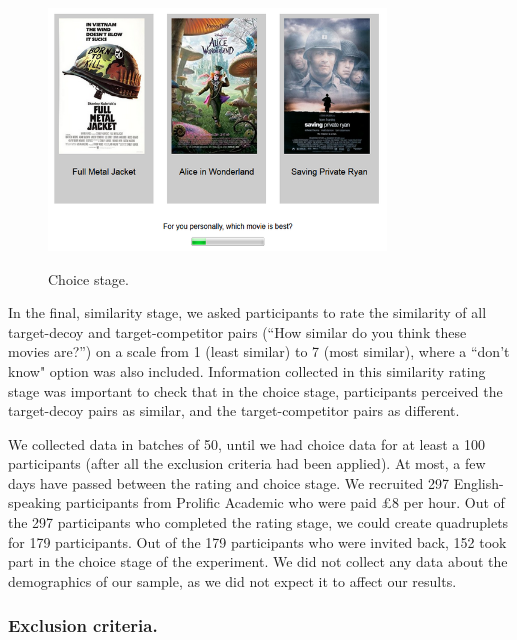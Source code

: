 \documentclass[12pt, a4paper]{article}
\begin{document}
\begin{figure}[htb!]
\centering
\caption{Choice stage.}
\includegraphics[width=0.8\textwidth]{rsz_exp1_choicestage.png}
\label{fig:exp1_screenshot}
\end{figure}

In the final, similarity stage, we asked participants to rate the similarity of all target-decoy and target-competitor pairs (``How similar do you think these movies are?'') on a scale from 1 (least similar) to 7 (most similar), where a ``don't know" option was also included. Information collected in this similarity rating stage was important to check that in the choice stage, participants perceived the target-decoy pairs as similar, and the target-competitor pairs as different.

We collected data in batches of 50, until we had choice data for at least a 100 participants (after all the exclusion criteria had been applied). At most, a few days have passed between the rating and choice stage. We recruited 297 English-speaking participants from Prolific Academic who were paid £8 per hour. Out of the 297 participants who completed the rating stage, we could create quadruplets for 179 participants. Out of the 179 participants who were invited back, 152 took part in the choice stage of the experiment. We did not collect any data about the demographics of our sample, as we did not expect it to affect our results.

\subsubsection*{Exclusion criteria.} \label{exclusion_ref}
\end{document}
